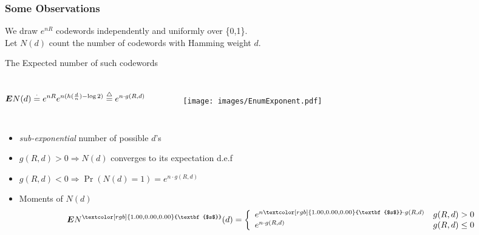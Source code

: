 \documentclass[mathserif]{beamer}
\newcommand {\exe} {\stackrel{\cdot} {=}}
\newcommand{\eqd}{\stackrel{\triangle}{=}}
\newcommand {\bE} {\mbox{\boldmath $E$}}
\begin{document}

\begin{frame}
\frametitle{Some Observations}
We draw $e^{nR}$ codewords independently and uniformly over \{0,1\}.\\
Let $N(d)$ count the number of codewords with Hamming weight $d$.
\begin{block}{The Expected number of such codewords}
\begin{columns}[c] %
\begin{align*}
    \bE N(d) \exe e^{nR}e^{n(h(\frac d n) - \log 2)}\eqd e^{n\cdot g(R,d)}
\end{align*}
\begin{figure}[htp]
\centering
\texttt{[image: images/EnumExponent.pdf]}
\end{figure}
\end{columns}
\end{block}
\begin{itemize}
\item \textit{sub-exponential} number of possible $d$'s
\item $g(R,d)>0 \Rightarrow N(d)$ converges to its expectation d.e.f
\item $g(R,d) < 0 \Rightarrow \Pr(N(d)=1)= e^{n\cdot g(R,d)}$
\item Moments of $N(d)$
\begin{align*}
    \bE N^{\textcolor[rgb]{1.00,0.00,0.00}{\textbf{$s$}}}(d) = \left\{
    \begin{array}{ll}
        e^{n\textcolor[rgb]{1.00,0.00,0.00}{\textbf{$s$}}\cdot g(R,d)} & g(R,d) > 0\\
        e^{n\cdot g(R,d)} & g(R,d) \leq 0
    \end{array}\right.
\end{align*}
\end{itemize}
\end{frame}
\end{document}
